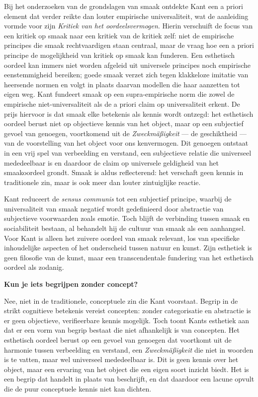 \documentclass[11pt,twoside,openright]{memoir}
\begin{document}
Bij het onderzoeken van de grondslagen van smaak ontdekte Kant een a priori element dat verder reikte dan louter empirische universaliteit, wat de aanleiding vormde voor zijn \textit{Kritiek van het oordeelsvermogen}. Hierin verschuift de focus van een kritiek op smaak naar een kritiek van de kritiek zelf: niet de empirische principes die smaak rechtvaardigen staan centraal, maar de vraag hoe een a priori principe de mogelijkheid van kritiek op smaak kan funderen. Een esthetisch oordeel kan immers niet worden afgeleid uit universele principes noch empirische eenstemmigheid bereiken; goede smaak verzet zich tegen klakkeloze imitatie van heersende normen en volgt in plaats daarvan modellen die haar aanzetten tot eigen weg.
Kant fundeert smaak op een supra-empirische norm die zowel de empirische niet-universaliteit als de a priori claim op universaliteit erkent. De prijs hiervoor is dat smaak elke betekenis als kennis wordt ontzegd: het esthetisch oordeel berust niet op objectieve kennis van het object, maar op een subjectief gevoel van genoegen, voortkomend uit de \textit{Zweckmäßigkeit} — de geschiktheid — van de voorstelling van het object voor ons kenvermogen. Dit genoegen ontstaat in een vrij spel van verbeelding en verstand, een subjectieve relatie die universeel mededeelbaar is en daardoor de claim op universele geldigheid van het smaakoordeel grondt. Smaak is aldus reflecterend: het verschaft geen kennis in traditionele zin, maar is ook meer dan louter zintuiglijke reactie.

Kant reduceert de \textit{sensus communis} tot een subjectief principe, waarbij de universaliteit van smaak negatief wordt gedefinieerd door abstractie van subjectieve voorwaarden zoals emotie. Toch blijft de verbinding tussen smaak en sociabiliteit bestaan, al behandelt hij de cultuur van smaak als een aanhangsel. Voor Kant is alleen het zuivere oordeel van smaak relevant, los van specifieke inhoudelijke aspecten of het onderscheid tussen natuur en kunst. Zijn esthetiek is geen filosofie van de kunst, maar een transcendentale fundering van het esthetisch oordeel als zodanig.

\bigskip
\noindent
\textbf{Kun je iets begrijpen zonder concept?}
\medskip

Nee, niet in de traditionele, conceptuele zin die Kant voorstaat. Begrip in de strikt cognitieve betekenis vereist concepten: zonder categorisatie en abstractie is er geen objectieve, verifieerbare kennis mogelijk. Toch toont Kants esthetiek aan dat er een vorm van begrip bestaat die niet afhankelijk is van concepten. Het esthetisch oordeel berust op een gevoel van genoegen dat voortkomt uit de harmonie tussen verbeelding en verstand, een \textit{Zweckmäßigkeit} die niet in woorden is te vatten, maar wel universeel mededeelbaar is. Dit is geen kennis over het object, maar een ervaring van het object die een eigen soort inzicht biedt. Het is een begrip dat handelt in plaats van beschrijft, en dat daardoor een lacune opvult die de puur conceptuele kennis niet kan dichten.
\end{document}
